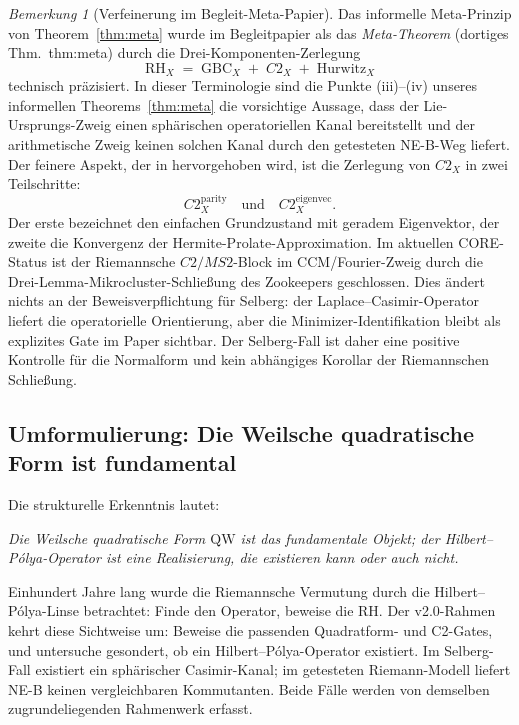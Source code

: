 \documentclass[12pt,a4paper]{article}
\theoremstyle{definition}
\theoremstyle{remark}
\newtheorem{remark}[theorem]{Bemerkung}
\newcommand{\QW}{\mathrm{QW}}
\begin{document}
\begin{remark}[Verfeinerung im Begleit-Meta-Papier]
\label{rem:meta-paper-refinement}
Das informelle Meta-Prinzip von Theorem~\ref{thm:meta} wurde im
Begleitpapier \cite{GeigerMeta2026} als das \emph{Meta-Theorem} (dortiges Thm.~thm:meta)
durch die Drei-Komponenten-Zerlegung
\[
\mathrm{RH}_X \;=\; \mathrm{GBC}_X \;+\; C2_X \;+\; \mathrm{Hurwitz}_X
\]
technisch präzisiert.
In dieser Terminologie sind die Punkte (iii)--(iv) unseres informellen Theorems~\ref{thm:meta}
die vorsichtige Aussage, dass der Lie-Ursprungs-Zweig einen sphärischen
operatoriellen Kanal bereitstellt und der arithmetische Zweig keinen solchen
Kanal durch den getesteten NE-B-Weg liefert.
Der feinere Aspekt, der in \cite{GeigerMeta2026} hervorgehoben wird,
ist die Zerlegung von $C2_X$ in zwei Teilschritte:
\[
C2_X^{\mathrm{parity}}
\quad\text{und}\quad
C2_X^{\mathrm{eigenvec}}.
\]
Der erste bezeichnet den einfachen Grundzustand mit geradem Eigenvektor,
der zweite die Konvergenz der Hermite-Prolate-Approximation. Im aktuellen CORE-Status
ist der Riemannsche $C2/MS2$-Block im CCM/Fourier-Zweig durch die
Drei-Lemma-Mikrocluster-Schließung des Zookeepers geschlossen. Dies ändert
nichts an der Beweisverpflichtung für Selberg: der Laplace--Casimir-Operator
liefert die operatorielle Orientierung, aber die Minimizer-Identifikation bleibt
als explizites Gate im Paper sichtbar. Der Selberg-Fall ist daher eine positive
Kontrolle für die Normalform und kein abhängiges Korollar der Riemannschen
Schließung.
\end{remark}

\subsection{Umformulierung: Die Weilsche quadratische Form ist fundamental}

Die strukturelle Erkenntnis lautet:

\medskip
\noindent\emph{Die Weilsche quadratische Form $\QW$ ist das fundamentale Objekt; der
Hilbert--Pólya-Operator ist eine Realisierung, die existieren kann oder auch nicht.}

\medskip
Einhundert Jahre lang wurde die Riemannsche Vermutung durch die
Hilbert--Pólya-Linse betrachtet: Finde den Operator, beweise die RH. Der
v2.0-Rahmen kehrt diese Sichtweise um: Beweise die passenden Quadratform- und
C2-Gates, und untersuche gesondert, ob ein Hilbert--Pólya-Operator existiert.
Im Selberg-Fall existiert ein sphärischer Casimir-Kanal; im getesteten
Riemann-Modell liefert NE-B keinen vergleichbaren Kommutanten.
Beide Fälle werden von demselben zugrundeliegenden Rahmenwerk erfasst.
\end{document}
